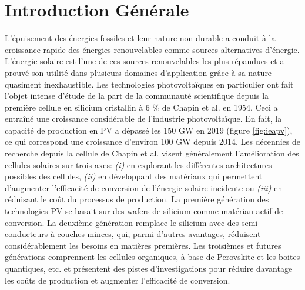 \newpage
\tableofcontents
\newpage

\chapter*{Introduction Générale}
\label{sec:intro}
L’épuisement des énergies fossiles et leur nature non-durable a conduit à la croissance rapide des énergies renouvelables comme sources alternatives d'énergie. L’énergie solaire est l’une de ces sources renouvelables les plus répandues et a prouvé son utilité dans plusieurs domaines d'application grâce à sa nature quasiment inexhaustible. Les technologies photovoltaïques en particulier ont fait l'objet intense d'étude de la part de la communauté scientifique depuis la première cellule en silicium cristallin à 6 \% de Chapin et al. \cite{Chapin1954} en 1954. Ceci a entraîné une croissance considérable de l'industrie photovoltaïque. En fait, la capacité de production en PV a dépassé les 150 GW \cite{iea2020} en 2019 (figure \ref{fig:ieapv}), ce qui correspond une croissance d'environ 100 GW depuis 2014. Les décennies de recherche depuis la cellule de Chapin et al. visent généralement l'amélioration des cellules solaires sur trois axes: \textit{(i)} en explorant les différentes architectures possibles des cellules, \textit{(ii)} en développant des matériaux qui permettent d'augmenter l'efficacité de conversion de l'énergie solaire incidente ou \textit{(iii)} en réduisant le coût du processus de production. La première génération des technologies PV se basait sur des wafers de silicium comme matériau actif de conversion. La deuxième génération remplace le silicium avec des semi-conducteurs à couches minces, qui, parmi d'autres avantages, réduisent considérablement les besoins en matières premières. Les troisièmes et futures générations comprennent les cellules organiques, à base de Perovskite et les boites quantiques, etc. et présentent des pistes d'investigations pour réduire davantage les coûts de production et augmenter l'efficacité de conversion.

